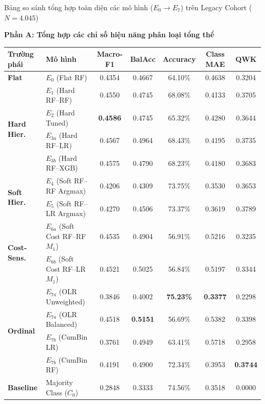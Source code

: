 \begin{table}{Bảng so sánh tổng hợp toàn diện các mô hình ($E_0 \to E_7$) trên Legacy Cohort ($N = 4.045$)}
\centering
\footnotesize
\setlength{\tabcolsep}{4pt}
\label{tab:master-comparison}

\vspace{-0.1cm}
\textbf{Phần A: Tổng hợp các chỉ số hiệu năng phân loại tổng thể}
\vspace{0.15cm}

\begin{tabularx}{\textwidth}{l X c c c c c}
\toprule
\textbf{Trường phái} & \textbf{Mô hình} & \textbf{Macro-F1} & \textbf{BalAcc} & \textbf{Accuracy} & \textbf{Class MAE} & \textbf{QWK} \\
\midrule
\textbf{Flat} & $E_0$ (Flat RF) & 0.4354 & 0.4667 & 64.10\% & 0.4638 & 0.3204 \\
\midrule
\multirow{4}{*}{\textbf{Hard Hier.}} 
  & $E_1$ (Hard RF--RF)   & 0.4550 & 0.4745 & 68.08\% & 0.4133 & 0.3705 \\
  & $E_2$ (Hard Tuned)    & \textbf{0.4586} & 0.4745 & 65.32\% & 0.4280 & 0.3644 \\
  & $E_{3a}$ (Hard RF--LR) & 0.4567 & 0.4964 & 68.43\% & 0.4195 & 0.3735 \\
  & $E_{3b}$ (Hard RF--XGB)& 0.4575 & 0.4790 & 68.23\% & 0.4180 & 0.3683 \\
\midrule
\multirow{2}{*}{\textbf{Soft Hier.}} 
  & $E_4$ (Soft RF--RF Argmax) & 0.4206 & 0.4309 & 73.75\% & 0.3530 & 0.3653 \\
  & $E_5$ (Soft RF--LR Argmax) & 0.4270 & 0.4506 & 73.37\% & 0.3619 & 0.3789 \\
\midrule
\multirow{2}{*}{\textbf{Cost-Sens.}}
  & $E_{6a}$ (Soft Cost RF--RF $M_1$) & 0.4535 & 0.4904 & 56.91\% & 0.5216 & 0.3235 \\
  & $E_{6b}$ (Soft Cost RF--LR $M_1$) & 0.4521 & 0.5025 & 56.84\% & 0.5197 & 0.3344 \\
\midrule
\multirow{4}{*}{\textbf{Ordinal}} 
  & $E_{7a}$ (OLR Unweighted) & 0.3846 & 0.4002 & \textbf{75.23\%} & \textbf{0.3377} & 0.2298 \\
  & $E_{7a}$ (OLR Balanced)   & 0.4518 & \textbf{0.5151} & 56.69\% & 0.5382 & 0.3398 \\
  & $E_{7b}$ (CumBin LR)      & 0.3761 & 0.4949 & 63.41\% & 0.5718 & 0.2958 \\
  & $E_{7b}$ (CumBin RF)      & 0.4191 & 0.4900 & 72.34\% & 0.3953 & \textbf{0.3744} \\
\midrule
\textbf{Baseline} & Majority Class ($C_0$) & 0.2848 & 0.3333 & 74.56\% & 0.3518 & 0.0000 \\
\bottomrule
\end{tabularx}


\end{table}
